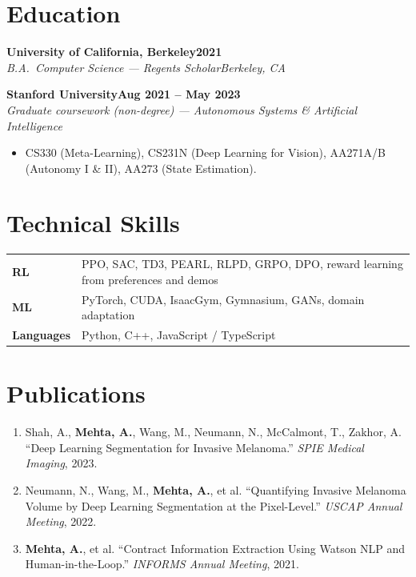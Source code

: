 \documentclass[10pt]{article}
\newcommand{\role}[4]{\par\vspace{5pt}\textbf{#1}\hfill\textbf{#2}\\\textit{#3}\hfill\textit{#4}}
\begin{document}
\section*{Education}

\role{University of California, Berkeley}{2021}{B.A.\ Computer Science --- Regents Scholar}{Berkeley, CA}

\role{Stanford University}{Aug 2021 -- May 2023}{Graduate coursework (non-degree) --- Autonomous Systems \& Artificial Intelligence}{}
\begin{itemize}
\item CS330 (Meta-Learning), CS231N (Deep Learning for Vision), AA271A/B (Autonomy I \& II), AA273 (State Estimation).
\end{itemize}

\section*{Technical Skills}
\begin{tabular}{@{}p{0.9in}l}
\textbf{RL} & PPO, SAC, TD3, PEARL, RLPD, GRPO, DPO, reward learning from preferences and demos \\
\textbf{ML} & PyTorch, CUDA, IsaacGym, Gymnasium, GANs, domain adaptation \\
\textbf{Languages} & Python, C++, JavaScript / TypeScript \\
\end{tabular}

\section*{Publications}
\begin{enumerate}[leftmargin=1.4em,itemsep=1pt,topsep=1pt]
\item Shah, A., \textbf{Mehta, A.}, Wang, M., Neumann, N., McCalmont, T., Zakhor, A. ``Deep Learning Segmentation for Invasive Melanoma.'' \textit{SPIE Medical Imaging}, 2023.
\item Neumann, N., Wang, M., \textbf{Mehta, A.}, et al. ``Quantifying Invasive Melanoma Volume by Deep Learning Segmentation at the Pixel-Level.'' \textit{USCAP Annual Meeting}, 2022.
\item \textbf{Mehta, A.}, et al. ``Contract Information Extraction Using Watson NLP and Human-in-the-Loop.'' \textit{INFORMS Annual Meeting}, 2021.
\end{enumerate}
\end{document}
